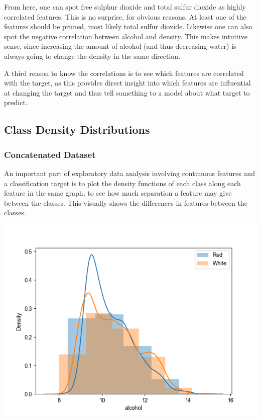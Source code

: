 \documentclass[12pt, letterpaper]{article}
\begin{document}
From here, one can spot free sulphur dioxide and total sulfur dioxide as highly correlated features. This is no surprise, for obvious reasons. At least one of the features should be pruned, most likely total sulfur dioxide. Likewise one can also spot the negative correlation between alcohol and density. This makes intuitive sense, since increasing the amount of alcohol (and thus decreasing water) is always going to change the density in the same direction.

A third reason to know the correlations is to see which features are correlated with the target, as this provides direct insight into which features are influential at changing the target and thus tell something to a model about what target to predict.

\subsection{Class Density Distributions}

\subsubsection{Concatenated Dataset}

An important part of exploratory data analysis involving continuous features and a classification target is to plot the density functions of each class along each feature in the same graph, to see how much separation a feature may give between the classes. This visually shows the differences in features between the classes.

\newcommand{\myscale}{.9775}
\includegraphics[scale=\myscale]{class_dist_alcohol.png}
\end{document}
